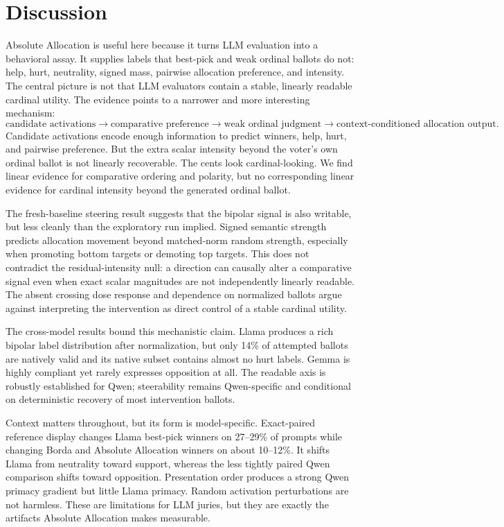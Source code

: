 \documentclass[11pt]{article}
\begin{document}
\section{Discussion}

Absolute Allocation is useful here because it turns LLM evaluation into a
behavioral assay. It supplies labels that best-pick and weak ordinal ballots
do not: help, hurt, neutrality, signed mass, pairwise allocation preference,
and intensity. The central picture is not that LLM evaluators contain a
stable, linearly readable cardinal utility. The evidence points to a narrower
and more interesting mechanism:
\[
\text{candidate activations}
\rightarrow
\text{comparative preference}
\rightarrow
\text{weak ordinal judgment}
\rightarrow
\text{context-conditioned allocation output}.
\]
Candidate activations encode enough information to predict winners, help,
hurt, and pairwise preference. But the extra scalar intensity beyond the
voter's own ordinal ballot is not linearly recoverable. The cents look
cardinal-looking. We find linear evidence for comparative ordering and
polarity, but no corresponding linear evidence for cardinal intensity beyond
the generated ordinal ballot.

The fresh-baseline steering result suggests that the bipolar signal is also
writable, but less cleanly than the exploratory run implied. Signed semantic
strength predicts allocation movement beyond matched-norm random strength,
especially when promoting bottom targets or demoting top targets. This does
not contradict the residual-intensity null: a direction can causally alter a
comparative signal even when exact scalar magnitudes are not independently
linearly readable. The absent crossing dose response and dependence on normalized ballots
argue against interpreting the intervention as direct control of a stable
cardinal utility.

The cross-model results bound this mechanistic claim. Llama produces a rich
bipolar label distribution after normalization, but only 14\% of attempted
ballots are natively valid and its native subset contains almost no hurt labels. Gemma
is highly compliant yet rarely expresses opposition at all. The readable axis
is robustly established for Qwen; steerability remains Qwen-specific and
conditional on deterministic recovery of most intervention ballots.

Context matters throughout, but its form is model-specific. Exact-paired
reference display changes Llama best-pick winners on 27--29\% of prompts while
changing Borda and Absolute Allocation winners on about 10--12\%. It shifts
Llama from neutrality toward support, whereas the less tightly paired Qwen
comparison shifts toward opposition. Presentation order produces a strong
Qwen primacy gradient but little Llama primacy. Random activation
perturbations are not harmless. These are limitations for LLM juries, but
they are exactly the artifacts Absolute Allocation makes measurable.
\end{document}
